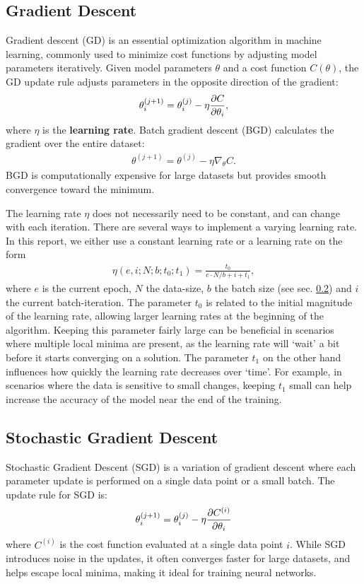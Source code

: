 \documentclass[%
reprint,s
amsmath,amssymb,
aps,
]{revtex4-2}
\begin{document}
\subsection{Gradient Descent}	\label{sec:gradient_descent}
Gradient descent (GD) is an essential optimization algorithm in machine learning, commonly used to minimize cost functions by adjusting model parameters iteratively. Given model parameters $\theta$ and a cost function $C(\theta)$, the GD update rule adjusts parameters in the opposite direction of the gradient:
\begin{align}
	\theta_i^{(j+1)}=\theta_i^{(j)}-\eta\pdv{C}{\theta_i},
\end{align}
where $\eta$ is the \textbf{learning rate}. Batch gradient descent (BGD) calculates the gradient over the entire dataset:
\begin{align}
	\theta^{(j+1)}=\theta^{(j)}-\eta\nabla_\theta C.
\end{align}
BGD is computationally expensive for large datasets but provides smooth convergence toward the minimum.

The learning rate \(\eta\) does not necessarily need to be constant, and can change with each iteration. There are several ways to implement a varying learning rate. In this report, we either use a constant learning rate or a learning rate on the form 
\begin{align} \label{eq:varyin_learning_rate}
	\eta(e,i;N;b;t_0;t_1) = \frac{t_0}{e\cdot N/b + i + t_1},
\end{align}
where \(e\) is the current epoch, \(N\) the data-size, \(b\) the batch size (see sec. \ref{sec:stochastic_gradient_descent}) and \(i\) the current batch-iteration. The parameter \(t_0\) is related to the initial magnitude of the learning rate, allowing larger learning rates at the beginning of the algorithm. Keeping this parameter fairly large can be beneficial in scenarios where multiple local minima are present, as the learning rate will `wait' a bit before it starts converging on a solution. The parameter \(t_1\) on the other hand influences how quickly the learning rate decreases over `time'. For example, in scenarios where the data is sensitive to small changes, keeping \(t_1\) small can help increase the accuracy of the model near the end of the training. 

\subsection{Stochastic Gradient Descent} \label{sec:stochastic_gradient_descent}
Stochastic Gradient Descent (SGD) is a variation of gradient descent where each parameter update is performed on a single data point or a small batch. The update rule for SGD is:
\[
\theta_i^{(j+1)} = \theta_i^{(j)} - \eta \pdv{C^{(i)}}{\theta_i}
\]
where $C^{(i)}$ is the cost function evaluated at a single data point $i$. While SGD introduces noise in the updates, it often converges faster for large datasets, and helps escape local minima, making it ideal for training neural networks.
\end{document}
